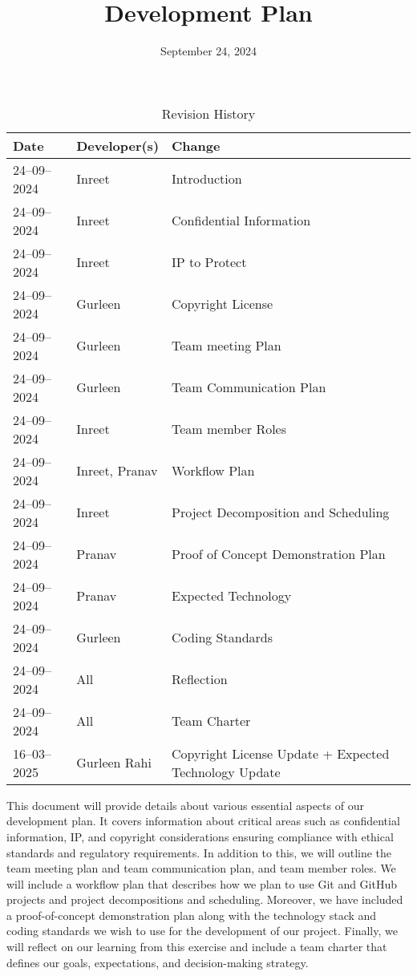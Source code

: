 \documentclass{article}
\title{Development Plan\\\progname}
\author{\authname}
\date{September 24, 2024}
\begin{document}
\maketitle

\begin{table}[hp]
\caption{Revision History} \label{TblRevisionHistory}
\begin{tabularx}{\textwidth}{llX}
\toprule
\textbf{Date} & \textbf{Developer(s)} & \textbf{Change}\\
\midrule
24--09--2024 & Inreet & Introduction\\
24--09--2024 & Inreet & Confidential Information\\
24--09--2024 & Inreet & IP to Protect\\
24--09--2024 & Gurleen & Copyright License\\
24--09--2024 & Gurleen & Team meeting Plan\\
24--09--2024 & Gurleen & Team Communication Plan\\
24--09--2024 & Inreet & Team member Roles\\
24--09--2024 & Inreet, Pranav & Workflow Plan\\
24--09--2024 & Inreet & Project Decomposition and Scheduling\\
24--09--2024 & Pranav & Proof of Concept Demonstration Plan\\
24--09--2024 & Pranav & Expected Technology\\
24--09--2024 & Gurleen & Coding Standards\\
24--09--2024 & All & Reflection\\
24--09--2024 & All & Team Charter\\
16--03--2025 & Gurleen Rahi & Copyright License Update + Expected Technology Update\\
\bottomrule
\end{tabularx}
\end{table}

\newpage{}

This document will provide details about various essential aspects of our development plan. It covers information about critical areas such as confidential information, IP, and copyright considerations ensuring compliance with ethical standards and regulatory requirements. In addition to this, we will outline the team meeting plan and team communication plan, and team member roles. We will include a workflow plan that describes how we plan to use Git and GitHub projects and project decompositions and scheduling. Moreover, we have included a proof-of-concept demonstration plan along with the technology stack and coding standards we wish to use for the development of our project. Finally, we will reflect on our learning from this exercise and include a team charter that defines our goals, expectations, and decision-making strategy.
\end{document}
